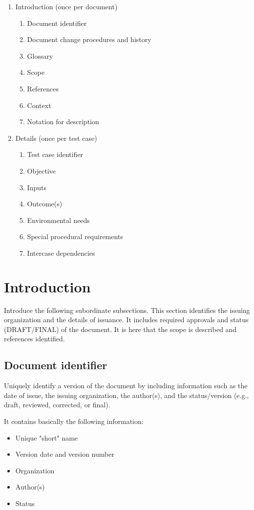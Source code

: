 \documentclass{./template/openetcs_report}
\begin{document}
\begin{enumerate}
\renewcommand{\labelenumii}{\arabic{enumi}.\arabic{enumii}.}
\item Introduction (once per document)
    \begin{enumerate}
        \item Document identifier 
        \item Document change procedures and history
        \item Glossary
        \item Scope
        \item References
        \item Context
        \item Notation for description
     \end{enumerate}
\item Details (once per test case)
     \begin{enumerate}
        \item Test case identifier 
        \item Objective
        \item Inputs
        \item Outcome(s)
        \item Environmental needs
        \item Special procedural requirements
        \item Intercase dependencies
      \end{enumerate}
\end{enumerate}

\section{Introduction}

Introduce the following subordinate subsections. This section identifies the
issuing organization and the details of issuance. It includes required approvals
and status (DRAFT/FINAL) of the document. It is here that the scope is described
and references identified.

\subsection{Document identifier}
Uniquely identify a version of the document by including information such as the
date of issue, the issuing organization, the author(s), 
and the status/version (e.g., draft, reviewed, corrected, or final). 

It contains basically the following information:
\begin{itemize}
\item Unique "short" name 
\item Version date and version number
\item Organization
\item Author(s)
\item Status 
\end{itemize}
\end{document}

